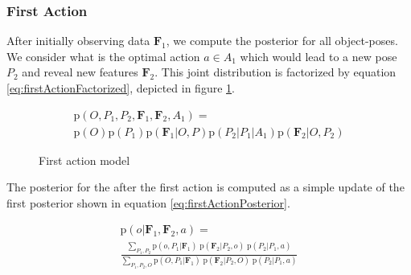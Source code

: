 \documentclass[conference]{IEEEtran}
\newcommand{\prob}[1]{\text{p}(#1)} %
\newcommand{\set}[1]{\mathbf{#1}} %
\begin{document}
    \subsubsection{First Action}
        After initially observing data $\set{F}_1$, we compute the posterior for all object-poses. We consider what is the optimal action $a \in A_1$ which would lead to a new pose $P_2$ and reveal new features $\set{F}_2$. This joint distribution is factorized by equation \ref{eq:firstActionFactorized}, depicted in figure \ref{fig:firstActionGraph}.

        \begin{multline}
            \label{eq:firstActionFactorized}
            \prob{O,P_1,P_2,\set{F}_1, \set{F}_2, A_1} = \\ \prob{O}\prob{P_1}\prob{\set{F}_1|O,P}\prob{P_2|P_1|A_1}\prob{\set{F}_2|O,P_2}
        \end{multline}

        \begin{figure}[h]
          \centering
          \label{fig:firstActionGraph}
          \caption{First action model}
        \end{figure}

        The posterior for the after the first action is computed as a simple update of the first posterior shown in equation \ref{eq:firstActionPosterior}.

        \begin{multline}
          \label{eq:firstActionPosterior}
          \prob{o|\set{F}_1,\set{F}_2,a} = \\ \frac{\sum_{P_1,P_2} \prob{o,P_1|\set{F}_1} \; \prob{\set{F}_2|P_2,o} \; \prob{P_2|P_1,a}}{\sum_{P_1,P_2,O} \prob{O,P_1|\set{F}_1} \; \prob{\set{F}_2|P_2,O} \; \prob{P_2|P_1,a}}
        \end{multline}
\end{document}
